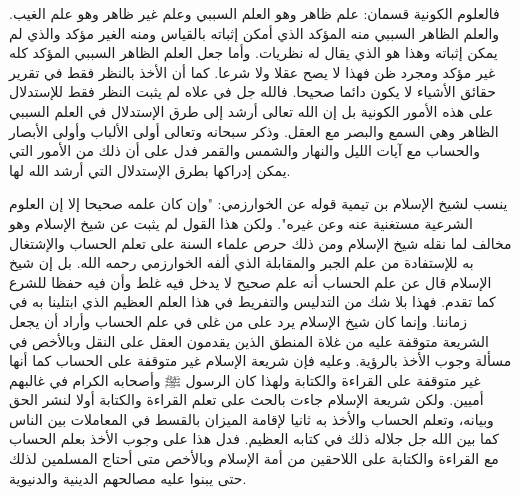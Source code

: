 فالعلوم الكونية قسمان: علم ظاهر وهو العلم السببي وعلم غير ظاهر وهو علم الغيب. والعلم الظاهر السببي منه المؤكد الذي أمكن إثباته بالقياس ومنه الغير مؤكد والذي لم يمكن إثباته وهذا هو الذي يقال له نظريات. وأما جعل العلم الظاهر السببي المؤكد كله غير مؤكد ومجرد ظن فهذا لا يصح عقلا ولا شرعا. كما أن الأخذ بالنظر فقط في تقرير حقائق الأشياء لا يكون دائما صحيحا. فالله جل في علاه لم يثبت النظر فقط للإستدلال على هذه الأمور الكونية بل إن الله تعالى أرشد إلى طرق الإستدلال في العلم السببي الظاهر وهي السمع والبصر مع العقل. وذكر سبحانه وتعالى أولى الألباب وأولى الأبصار والحساب مع آيات الليل والنهار والشمس والقمر فدل على أن ذلك من الأمور التي يمكن إدراكها بطرق الإستدلال التي أرشد الله لها.

ينسب لشيخ الإسلام بن تيمية قوله عن الخوارزمي: "وإن كان علمه صحيحا إلا إن العلوم الشرعية مستغنية عنه وعن غيره". ولكن هذا القول لم يثبت عن شيخ الإسلام وهو مخالف لما نقله شيخ الإسلام ومن ذلك حرص علماء السنة على تعلم الحساب والإشتغال به للإستفادة من علم الجبر والمقابلة الذي ألفه الخوارزمي رحمه الله. بل إن شيخ الإسلام قال عن علم الحساب أنه علم صحيح لا يدخل فيه غلط وأن فيه حفظا للشرع كما تقدم. فهذا بلا شك من التدليس والتفريط في هذا العلم العظيم الذي ابتلينا به في زماننا. وإنما كان شيخ الإسلام يرد على من غلى في علم الحساب وأراد أن يجعل الشريعة متوقفة عليه من غلاة المنطق الذين يقدمون العقل على النقل وبالأخص في مسألة وجوب الأخذ بالرؤية. وعليه فإن شريعة الإسلام غير متوقفة على الحساب كما أنها غير متوقفة على القراءة والكتابة ولهذا كان الرسول ﷺ وأصحابه الكرام في غالبهم أميين. ولكن شريعة الإسلام جاءت بالحث على تعلم القراءة والكتابة أولا لنشر الحق وبيانه، وتعلم الحساب والأخذ به ثانيا لإقامة الميزان بالقسط في المعاملات بين الناس كما بين الله جل جلاله ذلك في كتابه العظيم. فدل هذا على وجوب الأخذ بعلم الحساب مع القراءة والكتابة على اللاحقين من أمة الإسلام وبالأخص متى أحتاج المسلمين لذلك حتى يبنوا عليه مصالحهم الدينية والدنيوية. 

